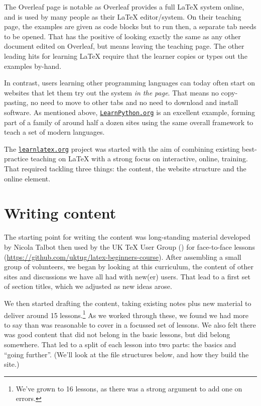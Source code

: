 \documentclass[harvardcite]{ltugboat}
\begin{document}
The Overleaf page is notable as Overleaf provides a full \LaTeX{} system
online, and is used by many people as their \LaTeX{} editor/system. On their
teaching page, the examples are given as code blocks but to run then, a
separate tab needs to be opened. That has the positive of looking exactly the
same as any other document edited on Overleaf, but means leaving the teaching
page. The other leading hits for learning \LaTeX{} require that the learner
copies or types out the examples by-hand.

In contrast, users learning other programming languages can today often start on
websites that let them try out the system \emph{in the page}. That means
no copy-pasting, no need to move to other tabs and no need to download and
install software. As mentioned above, \href{https://LearnPython.org}{\nolinkurl{LearnPython.org}} is an excellent
example, forming part of a family of around half a dozen sites using the
same overall framework to teach a set of modern languages.

The \href{https://learnlatex.org}{\nolinkurl{learnlatex.org}} project was started with the aim of combining existing
best-practice teaching on \LaTeX{} with a strong focus on interactive, online,
training. That required tackling three things: the content, the website
structure and the online element.

\section{Writing content}

The starting point for writing the content was long-standing material developed
by Nicola Talbot then used by the UK \TeX{} User Group () for
face-to-face lessons (\url{https://github.com/uktug/latex-beginners-course}). After 
assembling a small group of volunteers, we began by looking at this curriculum,
the content of other sites and discussions we have all had with new(er) users.
That lead to a first set of section titles, which we adjusted as new ideas
arose.

We then started drafting the content, taking existing notes plus new material
to deliver around 15 lessons.\footnote{We've grown to 16 lessons, as there was
a strong argument to add one on errors.} As we worked through these, we found
we had more to say than was reasonable to cover in a focussed set of lessons.
We also felt there was good content that did not belong in the basic lessons,
but did belong somewhere. That led to a split of each lesson into two parts:
the basics and \enquote{going further}. (We'll look at the file structures
below, and how they build the site.)
\end{document}
